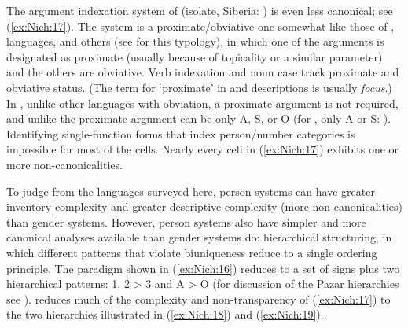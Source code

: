 \documentclass[output=collectionpaper]{langsci/langscibook}
\begin{document}
The argument indexation system of  (isolate, Siberia: \citealt{Maslov2003}) is even less canonical; see (\ref{ex:Nich:17}). The system is a proximate/obviative one somewhat like those of ,  languages, and others (see \citealt{Bickel2011} for this typology), in which one of the arguments is designated as proximate (usually because of topicality or a similar parameter) and the others are obviative. Verb indexation and noun case track proximate and obviative status. (The term for `proximate' in  and  descriptions is usually \textit{focus}.) In , unlike other languages with obviation, a proximate argument is not required, and unlike  the proximate argument can be only A, S, or O (for , only A or S: \citealt{Maslov2003a}). Identifying single-function forms that index person/number categories is impossible for most of the cells. Nearly every cell in (\ref{ex:Nich:17}) exhibits one or more non-canonicalities.

%

To judge from the languages surveyed here, person systems can have greater inventory complexity and greater descriptive complexity (more non-canonical\-i\-ties) than gender systems. However, person systems also have simpler and more canonical analyses available than gender systems do: hierarchical structuring, in which different patterns that violate biuniqueness reduce to a single ordering principle. The  paradigm shown in (\ref{ex:Nich:16}) reduces to a set of signs plus two hierarchical patterns: 1, 2 > 3 and A > O (for discussion of the Pazar  hierarchies see \citealt[48]{Oeztuerk2011}). \citet[17, 20]{Maslov2003} reduces much of the complexity and non-transparency of (\ref{ex:Nich:17}) to the two hierarchies illustrated in (\ref{ex:Nich:18}) and (\ref{ex:Nich:19}).
\end{document}
